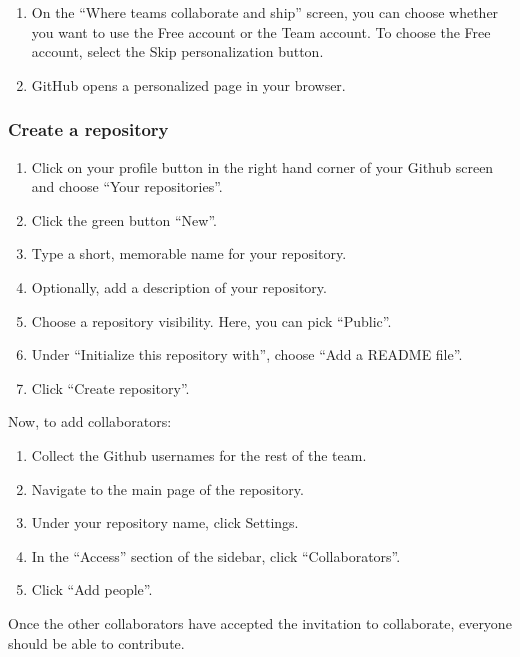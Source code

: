 \documentclass[
]{article}
\providecommand{\tightlist}{%
  \setlength{\itemsep}{0pt}\setlength{\parskip}{0pt}}
\begin{document}
\begin{enumerate}
\def\labelenumi{\arabic{enumi}.}
\setcounter{enumi}{7}
\tightlist
\item
  On the ``Where teams collaborate and ship'' screen, you can choose
  whether you want to use the Free account or the Team account. To
  choose the Free account, select the Skip personalization button.
\item
  GitHub opens a personalized page in your browser.
\end{enumerate}

\hypertarget{create-a-repository}{%
\subsubsection{Create a repository}\label{create-a-repository}}

\begin{enumerate}
\def\labelenumi{\arabic{enumi}.}
\tightlist
\item
  Click on your profile button in the right hand corner of your Github
  screen and choose ``Your repositories''.
\item
  Click the green button ``New''.
\item
  Type a short, memorable name for your repository.
\item
  Optionally, add a description of your repository.
\item
  Choose a repository visibility. Here, you can pick ``Public''.
\item
  Under ``Initialize this repository with'', choose ``Add a README
  file''.
\item
  Click ``Create repository''.
\end{enumerate}

Now, to add collaborators:

\begin{enumerate}
\def\labelenumi{\arabic{enumi}.}
\tightlist
\item
  Collect the Github usernames for the rest of the team.
\item
  Navigate to the main page of the repository.
\item
  Under your repository name, click Settings.
\item
  In the ``Access'' section of the sidebar, click ``Collaborators''.
\item
  Click ``Add people''.
\end{enumerate}

Once the other collaborators have accepted the invitation to
collaborate, everyone should be able to contribute.
\end{document}
